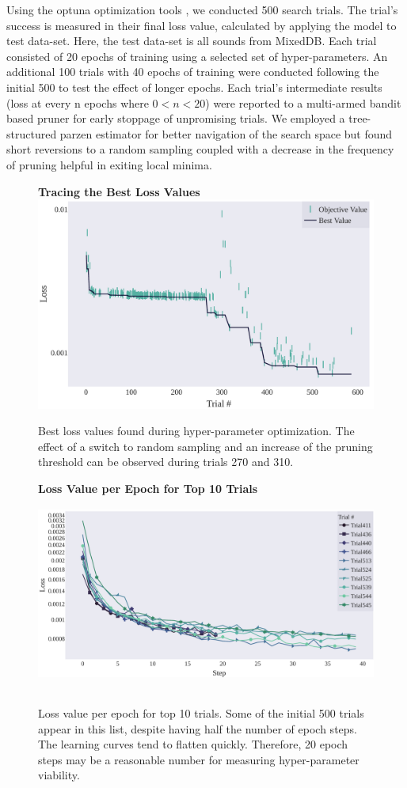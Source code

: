 \documentclass[\main/thesis.tex]{subfiles}
\begin{document}
Using the optuna optimization tools \cite{akiba2019optuna}, we conducted 500 search trials. The trial's success is measured in their final loss value, calculated by applying the model to test data-set. Here, the test data-set is all sounds from MixedDB. Each trial consisted of 20 epochs of training using a selected set of hyper-parameters. An additional 100 trials with 40 epochs of training were conducted following the initial 500 to test the effect of longer epochs. Each trial's intermediate results (loss at every n epochs where $0<n<20$) were reported to a multi-armed bandit based pruner for early stoppage of unpromising trials\cite{li2017hyperband}. We employed a tree-structured parzen estimator for better navigation of the search space \cite{bergstra2011algorithms,akiba2019optuna} but found short reversions to a random sampling coupled with a decrease in the frequency of pruning helpful in exiting local minima. \\
\begin{figure}[htbp]
\centering
\textbf{Tracing the Best Loss Values}
\includegraphics[width=12cm,height=7cm]{images/chapter_3/Optimization_History.pdf}
\caption{Best loss values found during hyper-parameter optimization. The effect of a switch to random sampling and an increase of the pruning threshold can be observed during trials 270 and 310.}
\label{chap3:bestvalues}
\end{figure}

\begin{figure}[]
\centering
\textbf{Loss Value per Epoch for Top 10 Trials}
\includegraphics[width=12cm,height=6.5cm]{images/chapter_3/loss_per_training.pdf}
\caption{Loss value per epoch for top 10 trials. Some of the initial 500 trials appear in this list, despite having half the number of epoch steps. The learning curves tend to flatten quickly. Therefore, 20 epoch steps may be a reasonable number for measuring hyper-parameter viability. }
\label{chap3:top10}
\end{figure}
\end{document}
